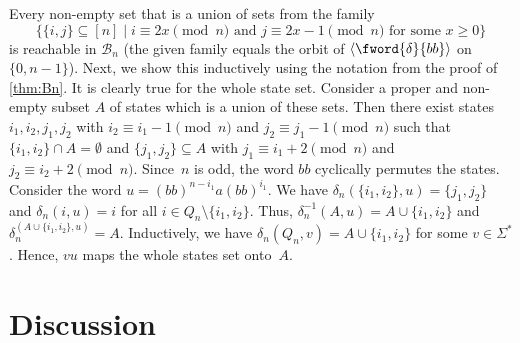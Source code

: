 \begin{remark}
	Every non-empty set that is a union 
	of sets from the family
	\[
	\{ \{i,j\} \subseteq [n] \mid \text{$i \equiv 2x\pmod{n}$ and $j \equiv 2x - 1 \pmod{n}$ for some $x \ge 0$} \}
	\]
	is reachable in $\mathcal B_n$ (the given family equals
	the orbit of $\langle \fword{\delta}{bb} \rangle$
	on $\{0, n - 1\}$).
	Next, we show this inductively using the notation from the proof of \cref{thm:Bn}.
	It is clearly true for the whole state set.
	Consider a proper and non-empty subset $A$ of states
	which is a union of these sets.
	Then there exist states $i_1, i_2, j_1, j_2$
	with $i_2 \equiv i_1 - 1 \pmod{n}$
	and $j_2 \equiv j_1 - 1 \pmod{n}$
	such that $\{i_1, i_2\} \cap A = \emptyset$ and
	$\{j_1, j_2\} \subseteq A$
	with $j_1 \equiv i_1 + 2 \pmod{n}$
	and $j_2 \equiv i_2 + 2 \pmod{n}$.
	Since~$n$ is odd, the word $bb$ cyclically permutes the states.
	Consider the word $u = (bb)^{n - i_1} a (bb)^{i_1}$.
	We have 
	$\delta_n( \{i_1, i_2\}, u ) = \{ j_1, j_2 \}$
	and $\delta_n(i, u) = i$
	for all $i \in Q_n \setminus \{i_1, i_2\}$.
	Thus, $\delta_n^{-1}(A, u) = A \cup \{ i_1, i_2 \}$
	and $\delta_n^(A \cup \{i_1, i_2\}, u) = A$.
	Inductively, we have $\delta_n(Q_n, v) = A \cup \{i_1, i_2\}$
	for some $v \in \Sigma^*$.
	Hence, $vu$ maps the whole states set onto~$A$.	
\end{remark}

\section{Discussion}
\label{sync_max:sec:slowly_sync_discussion}

